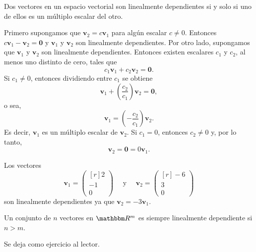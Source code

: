 \begin{theorem}{}{}
    Dos vectores en un espacio vectorial son linealmente dependientes si y solo si uno de ellos es un múltiplo escalar del otro.

    \tcblower
    \demostracion Primero supongamos que $\mathbf{v}_2 = c \mathbf{v}_1$ para algún escalar $c \neq 0$. Entonces $c \mathbf{v}_1 - \mathbf{v}_2 = \mathbf{0}$ y $\mathbf{v}_1$ y $\mathbf{v}_2$ son linealmente dependientes. Por otro lado, supongamos que $\mathbf{v}_1$ y $\mathbf{v}_2$ son linealmente dependientes. Entonces existen escalares $c_1$ y $c_2$, al menos uno distinto de cero, tales que
    $$c_1 \mathbf{v}_1 + c_2 \mathbf{v}_2 = \mathbf{0}.$$
    Si $c_1 \neq 0$, entonces dividiendo entre $c_1$ se obtiene
    $$\mathbf{v}_1 + \left(\frac{c_2}{c_1}\right) \mathbf{v}_2 = \mathbf{0},$$
    o sea,
    $$\mathbf{v}_1 = \left(-\frac{c_2}{c_1}\right) \mathbf{v}_2.$$
    Es decir, $\mathbf{v}_1$ es un múltiplo escalar de $\mathbf{v}_2$. Si $c_1 = 0$, entonces $c_2 \neq 0$ y, por lo tanto,
    $$\mathbf{v}_2 = \mathbf{0} = 0 \mathbf{v}_1.$$
\end{theorem}

\begin{examplebox}{}{}
    Los vectores
    $$\mathbf{v}_1 = \begin{pmatrix*}[r] 2 \\ -1 \\ 0 \end{pmatrix*} \quad \text{ y } \quad \mathbf{v}_2 = \begin{pmatrix*}[r] -6 \\ 3 \\ 0 \end{pmatrix*}$$
    son linealmente dependientes ya que $\mathbf{v}_2 = -3\mathbf{v}_1$.
\end{examplebox}

\begin{theorem}{}{}
    Un conjunto de $n$ vectores en $\RR[m]$ es siempre linealmente dependiente si $n > m$.

    \tcblower
    \demostracion Se deja como ejercicio al lector.
\end{theorem}

